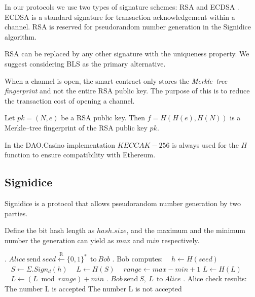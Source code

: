 In our protocols we use two types of signature schemes: RSA \cite{bib19} and ECDSA \cite{bib20}. ECDSA is a standard signature for transaction acknowledgement within a channel. RSA is reserved for pseudorandom number generation in the Signidice algorithm.

\begin{remark}
RSA can be replaced by any other signature with the uniqueness property. We suggest considering BLS \cite{bib10} as the primary alternative.
\end{remark}

When a channel is open, the smart contract only stores the \textit {Merkle--tree fingerprint} and not the entire RSA public key. The purpose of this is to reduce the transaction cost of opening a channel.

\begin{defn}
Let $pk = (N, e)$ be a RSA public key. Then $f = H(H(e), H(N))$ is a Merkle--tree fingerprint of the RSA public key $pk$. 
\end{defn}
\begin{remark}
In the DAO.Casino implementation $KECCAK-256$ \cite{bib21} is always used for the $H$ function to ensure compatibility with Ethereum. 
\end{remark}

	\subsection{Signidice}

Signidice \cite{bib18} is a protocol that allows pseudorandom number generation by two parties. 

Define the bit hash length as $hash.size$, and the maximum and the minimum number the generation can yield as $max$ and $min$ respectively.

\begin{algorithm} 
\caption*{$\textbf{Signidice}$} \label{alg:signidice}
\begin{algorithmic}
. $ Alice \ \text{send}\  seed\xleftarrow{\text{R}} \{0,1\}^* \  \ \text{to} \ Bob$
. Bob computes:
\State $\ \ \ \ h \gets H(seed)$
\State $\ \ \ \ S \gets  \Sigma . Sign_d(h)$
\State $\ \ \ \ L \gets H(S) $
\State $\ \ \ \ range \gets max - min +1$
\State$ L \gets H(L)$
\EndWhile
\State $ \ \ \ \  L \gets (L \bmod range) + min $
. $Bob \ \text{send}\  S, \ L \ \   \text{to} \ Alice$
. Alice check results:
\State The number L is accepted
\Else 
\State The number L is not accepted
\EndIf
\end{algorithmic}
\end{algorithm}

